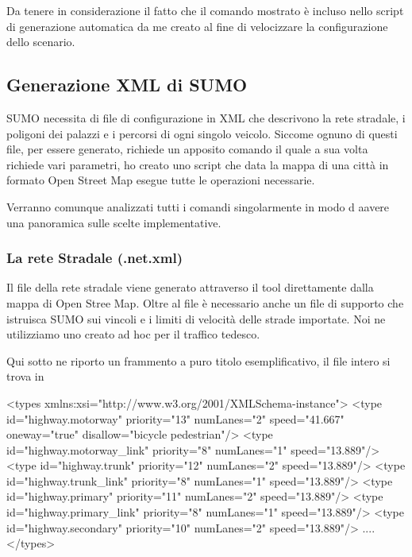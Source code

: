 %

Da tenere in considerazione il fatto che il comando mostrato è incluso nello script di generazione automatica da me creato al fine di velocizzare la configurazione dello scenario.

\subsection{Generazione XML di SUMO}

SUMO necessita di file di configurazione in XML che descrivono la rete stradale, i poligoni dei palazzi e i percorsi di ogni singolo veicolo. Siccome ognuno di questi file, per essere generato, richiede un apposito comando il quale a sua volta richiede vari parametri, ho creato uno script che data la mappa di una città in formato Open Street Map esegue tutte le operazioni necessarie.

Verranno comunque analizzati tutti i comandi singolarmente in modo d aavere una panoramica sulle scelte implementative.

\subsubsection{La rete Stradale (.net.xml)}

Il file della rete stradale viene generato attraverso il tool  direttamente dalla mappa di Open Stree Map. Oltre al file  è necessario anche un file di supporto che istruisca SUMO sui vincoli e i limiti di velocità delle strade importate. Noi ne utilizziamo uno creato ad hoc per il traffico tedesco. 

Qui sotto ne riporto un frammento a puro titolo esemplificativo, il file intero si trova in 

\begin{xml}
<types xmlns:xsi="http://www.w3.org/2001/XMLSchema-instance">
  <type id="highway.motorway" priority="13" numLanes="2" speed="41.667"
                oneway="true" disallow="bicycle pedestrian"/>
  <type id="highway.motorway_link" priority="8" numLanes="1" speed="13.889"/>
  <type id="highway.trunk" priority="12" numLanes="2" speed="13.889"/>
  <type id="highway.trunk_link" priority="8" numLanes="1" speed="13.889"/>
  <type id="highway.primary" priority="11" numLanes="2" speed="13.889"/>
  <type id="highway.primary_link" priority="8" numLanes="1" speed="13.889"/>
  <type id="highway.secondary" priority="10" numLanes="2" speed="13.889"/>
  ....
</types> 
\end{xml}

